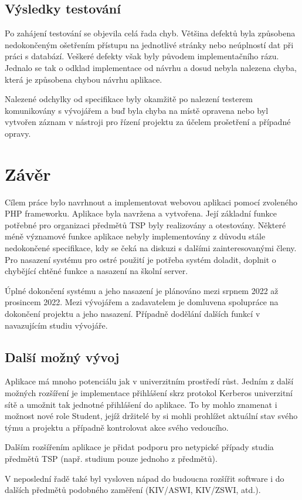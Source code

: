 \documentclass[czech,BP]{thesiskiv}
\begin{document}
	\section{Výsledky testování}
	\par Po zahájení testování se objevila celá řada chyb. Většina defektů byla způsobena nedokončeným ošetřením přístupu na jednotlivé stránky nebo neúplností dat při práci s databází. Veškeré defekty však byly původem implementačního rázu. Jednalo se tak o odklad implementace od návrhu a dosud nebyla nalezena chyba, která je způsobena chybou návrhu aplikace.
	\par Nalezené odchylky od specifikace byly okamžitě po nalezení testerem komunikovány s vývojářem a buď byla chyba na místě opravena nebo byl vytvořen záznam v nástroji pro řízení projektu za účelem prošetření a případné opravy.  
\chapter{Závěr}
	\par Cílem práce bylo navrhnout a implementovat webovou aplikaci pomocí zvoleného PHP frameworku. Aplikace byla navržena a vytvořena. Její základní funkce potřebné pro organizaci předmětů TSP byly realizovány a otestovány. Některé méně významové funkce aplikace nebyly implementovány z důvodu stále nedokončené specifikace, kdy se čeká na diskuzi s dalšími zainteresovanými členy. Pro nasazení systému pro ostré použití je potřeba systém doladit, doplnit o chybějící chtěné funkce a nasazení na školní server. 

	\par Úplné dokončení systému a jeho nasazení je plánováno mezi srpnem 2022 až prosincem 2022. Mezi vývojářem a zadavatelem je domluvena spolupráce na dokončení projektu a jeho nasazení. Případně dodělání dalších funkcí v navazujícím studiu vývojáře.
	\section{Další možný vývoj}
	\par Aplikace má mnoho potenciálu jak v univerzitním prostředí růst. Jedním z další možných rozšíření je implementace přihlášení skrz protokol Kerberos univerzitní sítě a umožnit tak jednotné přihlášení do aplikace. To by mohlo znamenat i možnost nové role Student, jejíž držitelé by si mohli prohlížet aktuální stav svého týmu a projektu a případně kontrolovat akce svého vedoucího.
	\par Dalším rozšířením aplikace je přidat podporu pro netypické případy studia předmětů TSP (např. studium pouze jednoho z předmětů).
	\par V neposlední řadě také byl vysloven nápad do budoucna rozšířit software i do dalších předmětů podobného zaměření (KIV/ASWI, KIV/ZSWI, atd.).
\listoffigures
%
%
\lstlistoflistings

% 
%

{\raggedright\small

}
\end{document}
